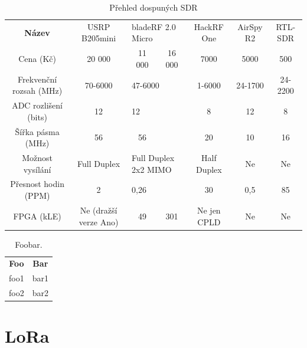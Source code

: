 \documentclass{ctuthesis}
\begin{document}
\begin{table}
\begin{ctucolortab}
\begin{tabular}{c|cccccc}
\bfseries
Název                   & USRP B205mini         & \multicolumn{2}{l}{bladeRF 2.0 Micro}    & HackRF One  & AirSpy R2 & RTL-SDR \\ \Midrule
Cena (Kč)               & 20 000                & 11 000              & 16 000             & 7000        & 5000      & 500     \\
Frekvenční rozsah (MHz) & 70-6000               & \multicolumn{2}{l}{47-6000}              & 1-6000      & 24-1700   & 24-2200 \\
ADC rozlišení (bits)    & 12                    & \multicolumn{2}{l}{12}                   & 8           & 12        & 8       \\
Šířka pásma (MHz)       & 56                    & 56                  &                    & 20          & 10        & 16      \\
Možnost vysílání        & Full Duplex           & \multicolumn{2}{l}{Full Duplex 2x2 MIMO} & Half Duplex & Ne        & Ne      \\
Přesnost hodin (PPM)    & 2                     & \multicolumn{2}{l}{0,26}                 & 30          & 0,5       & 85      \\
FPGA (kLE)              & Ne (dražší verze Ano) & 49                  & 301                & Ne jen CPLD & Ne        & Ne      \\ 
\end{tabular}
\end{ctucolortab}
\caption{Přehled dospuných SDR}
\label{tab:sdr}
\cite{etusresearch}
\cite{sdrreview2016}
\cite{itead}
\cite{sdrshowdown}
\end{table}

\begin{table}
\begin{ctucolortab}
\begin{tabular}{cc}
\bfseries Foo & \bfseries Bar \\\Midrule
foo1 & bar1 \\
foo2 & bar2
\end{tabular}
\end{ctucolortab}
\caption{Foobar.}
\label{tab:foobar}
\end{table}

\chapter{LoRa}
\end{document}
